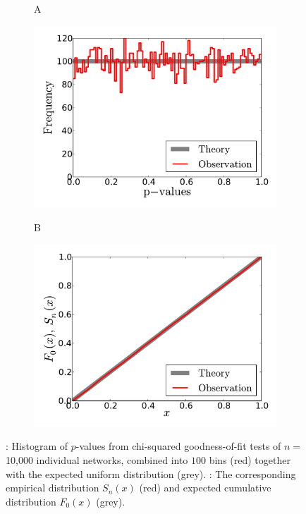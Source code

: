\begin{figure}[h]
  \centering
\begin{subfigure}[b]{0.49\textwidth}
	  \begin{flushleft}
	  \large A
		\end{flushleft}
    \centering
    \includegraphics[width=\textwidth]{RCC_2_hist.pdf}
    \label{subfig:RCC_hist_A}
\end{subfigure}
\begin{subfigure}[b]{0.49\textwidth}
	  \begin{flushleft}
	  \large B
		\end{flushleft}
    \centering
    \includegraphics[width=\textwidth]{RCC_2_CDF.pdf}
    \label{subfig:RCC_EDF_B}
\end{subfigure}
    \caption[Histogram and EDF of $p$-values from 10,000 chi-squared GOF tests]{: Histogram of $p$-values from chi-squared goodness-of-fit tests of $n =$ 10,000 individual networks, combined into $100$ bins (red) together with the expected uniform distribution (grey). : The corresponding empirical distribution $S_n(x)$ (red) and expected cumulative distribution $F_0(x)$ (grey).}
  \label{fig:RCC_results_1}
\end{figure}

